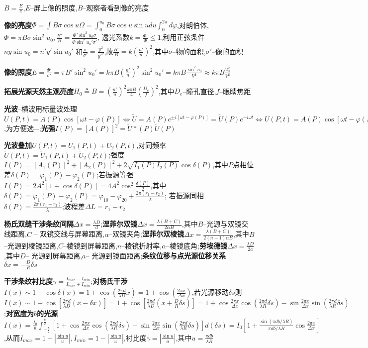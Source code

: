 \documentclass[10pt,a4paper]{article}
\begin{document}
$B=\frac{E}{\pi}$,$E$--屏上像的照度,$B$--观察者看到像的亮度

\textbf{像的亮度}$\Phi=\int B\sigma\cos u\Omega=\int_0^{u_0}B\sigma\cos u\sin udu\int_0^{2\pi}d\varphi$,对朗伯体,$\Phi=\pi B\sigma\sin^2u_0,\frac{B'}{B}=\frac{\Phi'\sin^2u_0\sigma}{\Phi\sin^2u_0'\sigma'}$, 透光系数$k=\frac{\Phi'}{\Phi}\leq1$,利用正弦条件$ny\sin u_0=n'y'\sin u_0'$ 和$\frac{\sigma}{\sigma'}=\frac{y^2}{y'^2}$,故$\frac{B'}{B}=k(\frac{n'}{n})^2$,其中$\sigma$--物的面积,$\sigma'$--像的面积

\textbf{像的照度}$E=\frac{\Phi'}{\sigma'}=\pi B'\sin^2u_0'=k\pi B(\frac{n'}{n})^2\sin^2u_0'=k\pi B\frac{\sin^2u_0}{V^2}\approx k\pi B\frac{u_0^2}{V^2}$

\textbf{拓展光源天然主观亮度}$H_0\triangleq B=(\frac{n'}{n})^2\frac{k\pi B}{4}(\frac{D_e}{f})^2$,其中$D_e$--瞳孔直径,$f$--眼睛焦距

\textbf{光波}--横波用标量波处理$U(P,t)=A(P)\cos[\omega t-\varphi(P)]\Leftrightarrow\widetilde{U}=A(P)e^{\pm i[\omega t-\varphi(P)]}=\widetilde{U}(P)e^{-i\omega t}\Leftrightarrow U(P,t)=A(P)\cos[\omega t-\varphi(P)]$,为方便选$-$;\textbf{光强}$I(P)=[A(P)]^2=\widetilde{U}*(P)\widetilde{U}(P)$

\textbf{光波叠加}$U(P,t)=U_1(P,t)+U_2(P,t)$,对同频率$\widetilde{U}(P,t)=\widetilde{U}_1(P,t)+\widetilde{U}_2(P,t)$;强度$I(P)=[A_1(P)]^2+[A_2(P)]^2+2\sqrt{I_1(P)I_2(P)}\cos\delta(P)$,其中$P$点相位差$\delta(P)=\varphi_1(P)-\varphi_2(P)$;若振源等强$I(P)=2A^2[1+\cos\delta(P)]=4A^2\cos^2\frac{\delta(P)}{2}$,其中$\delta(P)=\varphi_1(P)-\varphi_2(P)=\varphi_{10}-\varphi_{20}+\frac{2\pi(r_1-r_2)}{\lambda}$; 若振源同相$\delta(P)=\frac{2\pi(r_1-r_2)}{\lambda}$;波程差$\Delta L=r_1-r_2$

\textbf{杨氏双缝干涉条纹间隔}$\Delta x=\frac{\lambda D}{d}$;\textbf{涅菲尔双镜}$\Delta x=\frac{\lambda(B+C)}{2\alpha B}$,其中$B$--光源与双镜交线距离,$C$ -- 双镜交线与屏幕距离,$\alpha$--双镜夹角;\textbf{涅菲尔双棱镜}$\Delta x=\frac{\lambda(B+C)}{2(n-1)\alpha B}$,其中$B$--光源到棱镜距离,$C$--棱镜到屏幕距离,$n$--棱镜折射率,$\alpha$--棱镜底角;\textbf{劳埃德镜}$\Delta x=\frac{\lambda D}{2a}$,其中$D$-- 光源到屏幕距离,$a$-- 光源到镜面距离;\textbf{条纹位移与点光源位移关系}$\delta x=-\frac{D}{R}\delta s$

\textbf{干涉条纹衬比度}$\gamma=\frac{I_{max}-I_{min}}{I_{max}+I_{min}}$;\textbf{对杨氏干涉}$I(x)\sim1+\cos\delta(x)=1+\cos(\frac{2\pi d}{\lambda D}x)=1+\cos(\frac{2\pi x}{\Delta x})$,若光源移动$\delta s$则$I(x)\sim1+\cos[\frac{2\pi d}{\lambda D}(x-\delta x)]=1+\cos[\frac{2\pi d}{\lambda D}(x+\frac{D}{R}\delta s)]=1+\cos\frac{2\pi x}{\Delta x}\cos(\frac{2\pi d}{\lambda R}\delta s)-\sin\frac{2\pi x}{\Delta x}\sin(\frac{2\pi d}{\lambda R}\delta s)$;\textbf{对宽度为$b$的光源}$I(x)=\frac{I_0}{b}\int_{-\frac{b}{2}}^{\frac{b}{2}}[1+\cos\frac{2\pi x}{\Delta x}\cos(\frac{2\pi d}{\lambda R}\delta s)-\sin\frac{2\pi x}{\Delta x}\sin(\frac{2\pi d}{\lambda R}\delta s)]d(\delta s)=I_0[1+\frac{\sin(\pi db/\lambda R)}{\pi db/\lambda R}\cos\frac{2\pi x}{\Delta x}]$,从而$I_{max}=1+|\frac{\sin u}{u}|,I_{min}=1-|\frac{\sin u}{u}|$,衬比度$\gamma=|\frac{\sin u}{u}|$,其中$u=\frac{\pi db}{\lambda R}$
\end{document}
